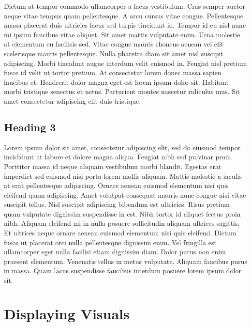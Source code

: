 \documentclass[letterpaper,10pt,english]{sphinxmanual}
\begin{document}
\sphinxAtStartPar
Dictum at tempor commodo ullamcorper a lacus vestibulum. Cras semper auctor neque vitae tempus quam pellentesque. A arcu cursus vitae congue. Pellentesque massa placerat duis ultricies lacus sed turpis tincidunt id. Tempor id eu nisl nunc mi ipsum faucibus vitae aliquet. Sit amet mattis vulputate enim. Urna molestie at elementum eu facilisis sed. Vitae congue mauris rhoncus aenean vel elit scelerisque mauris pellentesque. Nulla pharetra diam sit amet nisl suscipit adipiscing. Morbi tincidunt augue interdum velit euismod in. Feugiat nisl pretium fusce id velit ut tortor pretium. At consectetur lorem donec massa sapien faucibus et. Hendrerit dolor magna eget est lorem ipsum dolor sit. Habitant morbi tristique senectus et netus. Parturient montes nascetur ridiculus mus. Sit amet consectetur adipiscing elit duis tristique.


\section{Heading 3}
\label{\detokenize{topic1:heading-3}}
\sphinxAtStartPar
Lorem ipsum dolor sit amet, consectetur adipiscing elit, sed do eiusmod tempor incididunt ut labore et dolore magna aliqua. Feugiat nibh sed pulvinar proin. Porttitor massa id neque aliquam vestibulum morbi blandit. Egestas erat imperdiet sed euismod nisi porta lorem mollis aliquam. Mattis molestie a iaculis at erat pellentesque adipiscing. Ornare aenean euismod elementum nisi quis eleifend quam adipiscing. Amet volutpat consequat mauris nunc congue nisi vitae suscipit tellus. Nisl suscipit adipiscing bibendum est ultricies. Risus pretium quam vulputate dignissim suspendisse in est. Nibh tortor id aliquet lectus proin nibh. Aliquam eleifend mi in nulla posuere sollicitudin aliquam ultrices sagittis. Et ultrices neque ornare aenean euismod elementum nisi quis eleifend. Dictum fusce ut placerat orci nulla pellentesque dignissim enim. Vel fringilla est ullamcorper eget nulla facilisi etiam dignissim diam. Dolor purus non enim praesent elementum. Venenatis tellus in metus vulputate. Aliquam faucibus purus in massa. Quam lacus suspendisse faucibus interdum posuere lorem ipsum dolor sit.

\sphinxstepscope


\chapter{Displaying Visuals}
\label{\detokenize{topic2:displaying-visuals}}\label{\detokenize{topic2::doc}}
\end{document}
